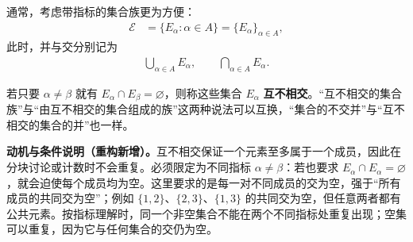 \documentclass[../../main.tex]{subfiles}%
\begin{document}
通常，考虑带指标的集合族更为方便：
\begin{align*}
\mathscr{E}&=\{E_\alpha:\alpha\in A\}=\{E_\alpha\}_{\alpha\in A},
\end{align*}
此时，并与交分别记为
\begin{align*}
\bigcup_{\alpha\in A}E_\alpha,\qquad \bigcap_{\alpha\in A}E_\alpha.
\end{align*}

\begin{definition}[互不相交的集合族]\label{definition:ch00-disjoint-family}
若只要 $\alpha\neq\beta$ 就有 $E_\alpha\cap E_\beta=\varnothing$，则称这些集合 $E_\alpha$ \textbf{互不相交}。“互不相交的集合族”与“由互不相交的集合组成的族”这两种说法可以互换，“集合的不交并”与“互不相交的集合的并”也一样。
\end{definition}
\begin{remark}
\textbf{动机与条件说明（重构新增）。}互不相交保证一个元素至多属于一个成员，因此在分块讨论或计数时不会重复。必须限定为不同指标 $\alpha\ne\beta$：若也要求 $E_\alpha\cap E_\alpha=\varnothing$，就会迫使每个成员均为空。这里要求的是每一对不同成员的交为空，强于“所有成员的共同交为空”；例如 $\{1,2\}$、$\{2,3\}$、$\{1,3\}$ 的共同交为空，但任意两者都有公共元素。按指标理解时，同一个非空集合不能在两个不同指标处重复出现；空集可以重复，因为它与任何集合的交仍为空。
\end{remark}
\end{document}
